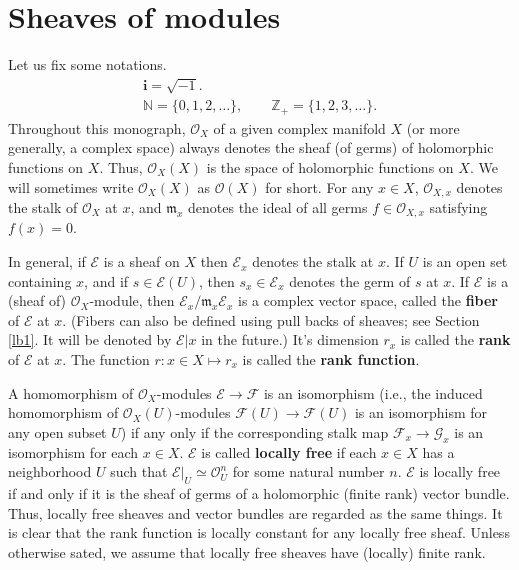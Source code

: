 \documentclass[12pt,b5paper,notitlepage]{report}
\theoremstyle{definition}
\theoremstyle{plain}
\newcommand{\fk}{\mathfrak}
\newcommand{\scr}{\mathscr}
\newcommand{\im}{\mathbf{i}}
\newcommand{\Nbb}{\mathbb N}
\newcommand{\Zbb}{\mathbb Z}
\numberwithin{equation}{section}
\begin{document}
\section{Sheaves of modules}
Let us  fix some notations.    
\begin{gather*}
\im=\sqrt{-1}.\\
\Nbb=\{0,1,2,\dots\},\qquad \Zbb_+=\{1,2,3,\dots\}.
\end{gather*}
Throughout this monograph, $\scr O_X$ of a given complex manifold $X$ (or more generally, a complex space) always denotes the sheaf (of germs) of holomorphic functions on $X$. Thus, $\scr O_X(X)$ is the space of holomorphic functions on $X$. We will sometimes write $\scr O_X(X)$ as $\scr O(X)$ for short. For any $x\in X$, $\scr O_{X,x}$ denotes the stalk of $\scr O_X$ at $x$, and $\fk m_x$ denotes the ideal of all germs $f\in\scr O_{X,x}$ satisfying $f(x)=0$. 



In general, if $\scr E$ is a sheaf on $X$ then $\scr E_x$ denotes the stalk at $x$. \index{Ex@$\scr E_x$} If $U$ is an open set containing $x$, and if $s\in\scr E(U)$, then $s_x\in\scr E_x$ denotes the germ of $s$ at $x$. \index{Ex@$\scr E_x$!$s_x$} If $\scr E$ is a (sheaf of) $\scr O_X$-module, then  $\scr E_x/\fk m_x\scr E_x$ is a complex vector space, called the \textbf{fiber} of $\scr E$ at $x$. (Fibers can also be defined using pull backs of sheaves; see Section \ref{lb1}. It will be denoted by $\scr E|x$ in the future.) \index{EX@ ${\scr E\lvert X},\scr E\lvert x$} It's dimension $r_x$ is called the \textbf{rank} of $\scr E$ at $x$. The function $r:x\in X\mapsto r_x$ is called the \textbf{rank function}.


A homomorphism of $\scr O_X$-modules $\scr E\rightarrow\scr F$ is an isomorphism (i.e., the induced homomorphism of $\scr O_X(U)$-modules $\scr F(U)\rightarrow\scr F(U)$ is an isomorphism for any open subset $U$) if any only if the corresponding stalk map $\scr F_x\rightarrow\scr G_x$ is an isomorphism for each $x\in X$. $\scr E$ is called \textbf{locally free} if  each $x\in X$ has a neighborhood $U$ such that $\scr E|_U\simeq \scr O_U^n$ for some natural number $n$. $\scr E$ is locally free if and only if it is the sheaf of germs of a holomorphic (finite rank) vector bundle. Thus, locally free sheaves and vector bundles are regarded as the same things. It is clear that the rank function is locally constant for any locally free sheaf. Unless otherwise sated, we assume that locally free sheaves  have (locally) finite rank. 
\end{document}
